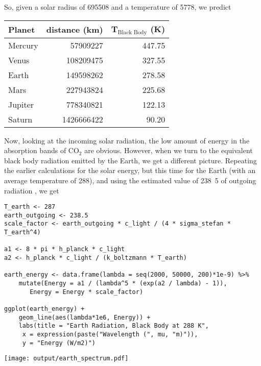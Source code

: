 \documentclass[10pt,a4paper,titlepage]{article}
\begin{document}
So, given a solar radius of \unit{695508}{\kilo\metre} and a
temperature of \unit{5778}{\kelvin}, we predict

\begin{center}
\begin{tabular}{lrr}
\toprule
Planet & distance (km) & T$_{\text{Black Body}}$ (K)\\
\midrule
Mercury & 57909227 & 447.75\\
Venus & 108209475 & 327.55\\
Earth & 149598262 & 278.58\\
Mars & 227943824 & 225.68\\
Jupiter & 778340821 & 122.13\\
Saturn & 1426666422 & 90.20\\
\bottomrule
\end{tabular}
\end{center}

Now, looking at the incoming solar radiation, the low amount of energy
in the absorption bands of CO$_{\text{2}}$ are obvious.  However, when we turn
to the equivalent black body radiation emitted by the Earth, we get a
different picture. Repeating the earlier calculations for the solar
energy, but this time for the Earth (with an average temperature of
\unit{288}{\kelvin}), and using the estimated value of
\unit{238.5}{\watt\per\metre\squared} of outgoing radiation
\citep{trenberth-al09:budget}, we get
\begin{lstlisting}
T_earth <- 287
earth_outgoing <- 238.5
scale_factor <- earth_outgoing * c_light / (4 * sigma_stefan * T_earth^4)

a1 <- 8 * pi * h_planck * c_light
a2 <- h_planck * c_light / (k_boltzmann * T_earth)

earth_energy <- data.frame(lambda = seq(2000, 50000, 200)*1e-9) %>%
    mutate(Energy = a1 / (lambda^5 * (exp(a2 / lambda) - 1)),
	   Energy = Energy * scale_factor)

ggplot(earth_energy) +
    geom_line(aes(lambda*1e6, Energy)) +
    labs(title = "Earth Radiation, Black Body at 288 K",
	 x = expression(paste("Wavelength (", mu, "m)")),
	 y = "Energy (W/m2)")
\end{lstlisting}

\texttt{[image: output/earth\_spectrum.pdf]}
\end{document}
